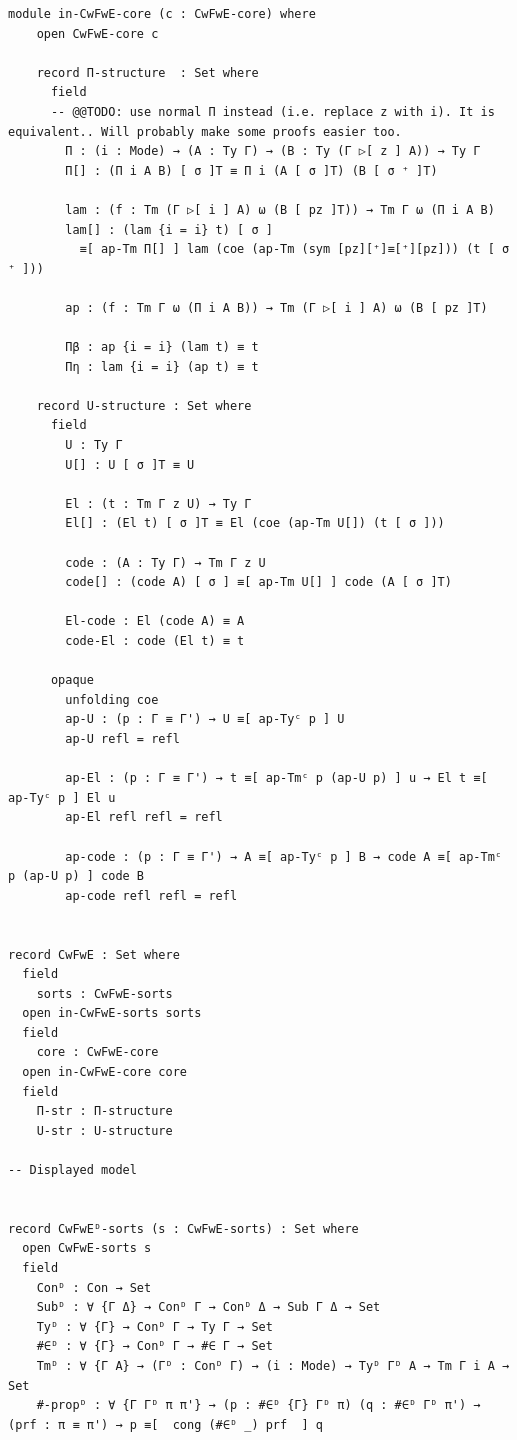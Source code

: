 {\begin{Verbatim}[breaklines=true,breakanywhere=true,fontsize=\scriptsize]
  module in-CwFwE-core (c : CwFwE-core) where
    open CwFwE-core c

    record Π-structure  : Set where
      field
      -- @@TODO: use normal Π instead (i.e. replace z with i). It is equivalent.. Will probably make some proofs easier too.
        Π : (i : Mode) → (A : Ty Γ) → (B : Ty (Γ ▷[ z ] A)) → Ty Γ
        Π[] : (Π i A B) [ σ ]T ≡ Π i (A [ σ ]T) (B [ σ ⁺ ]T)

        lam : (f : Tm (Γ ▷[ i ] A) ω (B [ pz ]T)) → Tm Γ ω (Π i A B)
        lam[] : (lam {i = i} t) [ σ ]
          ≡[ ap-Tm Π[] ] lam (coe (ap-Tm (sym [pz][⁺]≡[⁺][pz])) (t [ σ ⁺ ]))

        ap : (f : Tm Γ ω (Π i A B)) → Tm (Γ ▷[ i ] A) ω (B [ pz ]T)

        Πβ : ap {i = i} (lam t) ≡ t
        Πη : lam {i = i} (ap t) ≡ t

    record U-structure : Set where
      field
        U : Ty Γ
        U[] : U [ σ ]T ≡ U

        El : (t : Tm Γ z U) → Ty Γ
        El[] : (El t) [ σ ]T ≡ El (coe (ap-Tm U[]) (t [ σ ]))

        code : (A : Ty Γ) → Tm Γ z U
        code[] : (code A) [ σ ] ≡[ ap-Tm U[] ] code (A [ σ ]T)

        El-code : El (code A) ≡ A
        code-El : code (El t) ≡ t

      opaque
        unfolding coe
        ap-U : (p : Γ ≡ Γ') → U ≡[ ap-Tyᶜ p ] U
        ap-U refl = refl

        ap-El : (p : Γ ≡ Γ') → t ≡[ ap-Tmᶜ p (ap-U p) ] u → El t ≡[ ap-Tyᶜ p ] El u
        ap-El refl refl = refl

        ap-code : (p : Γ ≡ Γ') → A ≡[ ap-Tyᶜ p ] B → code A ≡[ ap-Tmᶜ p (ap-U p) ] code B
        ap-code refl refl = refl


record CwFwE : Set where
  field
    sorts : CwFwE-sorts
  open in-CwFwE-sorts sorts
  field
    core : CwFwE-core
  open in-CwFwE-core core
  field
    Π-str : Π-structure
    U-str : U-structure

-- Displayed model

    
record CwFwEᴰ-sorts (s : CwFwE-sorts) : Set where
  open CwFwE-sorts s
  field
    Conᴰ : Con → Set
    Subᴰ : ∀ {Γ Δ} → Conᴰ Γ → Conᴰ Δ → Sub Γ Δ → Set
    Tyᴰ : ∀ {Γ} → Conᴰ Γ → Ty Γ → Set
    #∈ᴰ : ∀ {Γ} → Conᴰ Γ → #∈ Γ → Set
    Tmᴰ : ∀ {Γ A} → (Γᴰ : Conᴰ Γ) → (i : Mode) → Tyᴰ Γᴰ A → Tm Γ i A → Set
    #-propᴰ : ∀ {Γ Γᴰ π π'} → (p : #∈ᴰ {Γ} Γᴰ π) (q : #∈ᴰ Γᴰ π') → (prf : π ≡ π') → p ≡[  cong (#∈ᴰ _) prf  ] q


\end{Verbatim}}
